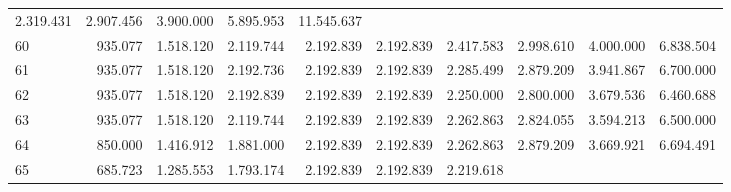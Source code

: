 \begin{tabular}{llllllllll}
  \multicolumn{1}{r}{2.319.431} &
  \multicolumn{1}{r}{2.907.456} &
  \multicolumn{1}{r}{3.900.000} &
  \multicolumn{1}{r}{5.895.953} &
  \multicolumn{1}{r}{11.545.637} \\
\multicolumn{1}{l}{\hspace{1em}60} &
  \multicolumn{1}{|r}{935.077} &
  \multicolumn{1}{r}{1.518.120} &
  \multicolumn{1}{r}{2.119.744} &
  \multicolumn{1}{r}{2.192.839} &
  \multicolumn{1}{r}{2.192.839} &
  \multicolumn{1}{r}{2.417.583} &
  \multicolumn{1}{r}{2.998.610} &
  \multicolumn{1}{r}{4.000.000} &
  \multicolumn{1}{r}{6.838.504} \\
\multicolumn{1}{l}{\hspace{1em}61} &
  \multicolumn{1}{|r}{935.077} &
  \multicolumn{1}{r}{1.518.120} &
  \multicolumn{1}{r}{2.192.736} &
  \multicolumn{1}{r}{2.192.839} &
  \multicolumn{1}{r}{2.192.839} &
  \multicolumn{1}{r}{2.285.499} &
  \multicolumn{1}{r}{2.879.209} &
  \multicolumn{1}{r}{3.941.867} &
  \multicolumn{1}{r}{6.700.000} \\
\multicolumn{1}{l}{\hspace{1em}62} &
  \multicolumn{1}{|r}{935.077} &
  \multicolumn{1}{r}{1.518.120} &
  \multicolumn{1}{r}{2.192.839} &
  \multicolumn{1}{r}{2.192.839} &
  \multicolumn{1}{r}{2.192.839} &
  \multicolumn{1}{r}{2.250.000} &
  \multicolumn{1}{r}{2.800.000} &
  \multicolumn{1}{r}{3.679.536} &
  \multicolumn{1}{r}{6.460.688} \\
\multicolumn{1}{l}{\hspace{1em}63} &
  \multicolumn{1}{|r}{935.077} &
  \multicolumn{1}{r}{1.518.120} &
  \multicolumn{1}{r}{2.119.744} &
  \multicolumn{1}{r}{2.192.839} &
  \multicolumn{1}{r}{2.192.839} &
  \multicolumn{1}{r}{2.262.863} &
  \multicolumn{1}{r}{2.824.055} &
  \multicolumn{1}{r}{3.594.213} &
  \multicolumn{1}{r}{6.500.000} \\
\multicolumn{1}{l}{\hspace{1em}64} &
  \multicolumn{1}{|r}{850.000} &
  \multicolumn{1}{r}{1.416.912} &
  \multicolumn{1}{r}{1.881.000} &
  \multicolumn{1}{r}{2.192.839} &
  \multicolumn{1}{r}{2.192.839} &
  \multicolumn{1}{r}{2.262.863} &
  \multicolumn{1}{r}{2.879.209} &
  \multicolumn{1}{r}{3.669.921} &
  \multicolumn{1}{r}{6.694.491} \\
\multicolumn{1}{l}{\hspace{1em}65} &
  \multicolumn{1}{|r}{685.723} &
  \multicolumn{1}{r}{1.285.553} &
  \multicolumn{1}{r}{1.793.174} &
  \multicolumn{1}{r}{2.192.839} &
  \multicolumn{1}{r}{2.192.839} &
  \multicolumn{1}{r}{2.219.618} &

\end{tabular}
